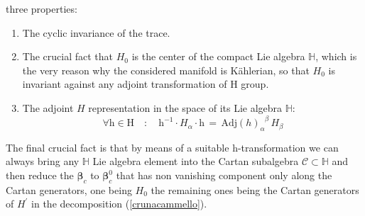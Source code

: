 \documentclass[10pt,a4paper]{article}
\begin{document}
three properties:
\begin{enumerate}
  \item The cyclic invariance of the trace.
  \item The crucial fact that $H_0$ is the center of the compact Lie algebra $\mathbb{H}$, which is the very reason why the considered manifold is K\"ahlerian, so that $H_0$ is invariant against any adjoint transformation of $\mathrm{H}$ group.
  \item {The adjoint $H$ representation in the space of its Lie algebra $\mathbb{H}$:
  \begin{equation}\label{aggiungiunposto}
   \forall \mathrm{h}\in \mathrm{H} \quad : \quad \mathrm{h}^{-1} \cdot H_\alpha \cdot \mathrm{h} \, =
  \, \mathrm{Adj}(h)_\alpha^{\phantom{\alpha}\beta} \, H_\beta
  \end{equation}
  }
  \end{enumerate}
The final crucial fact is that by means of a suitable $\mathrm{\mathrm{h}}$-transformation we can always bring any
$\mathbb{\mathbb{H}}$ Lie algebra element into the Cartan subalgebra $\mathcal{C}\subset \mathbb{H}$ and then reduce the $\boldsymbol{\beta}_c$ to $\boldsymbol{\beta}_c^0$ that has non vanishing component only along the Cartan generators, one being $H_0$ the remaining ones being the Cartan generators of $H^\prime$ in the decomposition
(\ref{crunacammello}).
\end{document}

